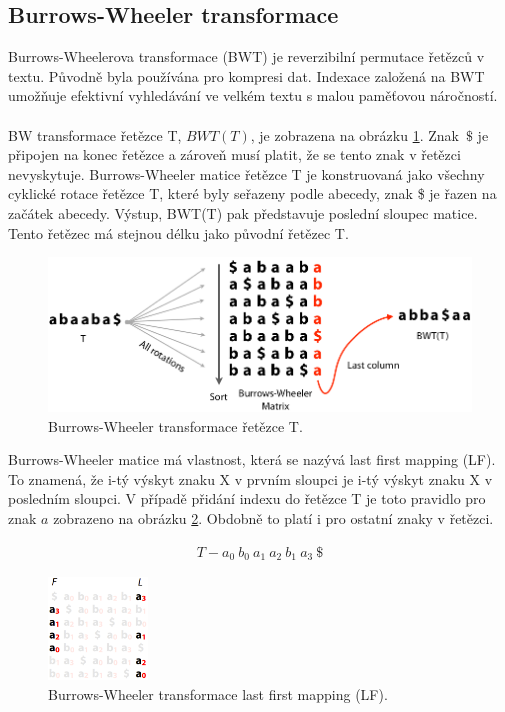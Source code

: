 \documentclass[czech,DP]{thesiskiv}
\numberwithin{equation}{section}
\begin{document}
\subsection{Burrows-Wheeler transformace}
Burrows-Wheelerova transformace (BWT) je reverzibilní permutace řetězců v textu. Původně byla používána pro kompresi dat. Indexace založená na BWT umožňuje efektivní vyhledávání ve velkém textu s malou paměťovou náročností. 
\\
\\
BW transformace řetězce T, $BWT(T)$, je zobrazena na obrázku \ref{fig:bw_transform_1}. Znak~$\$$ je připojen na konec řetězce a zároveň musí platit, že se tento znak v řetězci nevyskytuje. Burrows-Wheeler matice řetězce T je konstruovaná jako všechny cyklické rotace řetězce T, které byly seřazeny podle abecedy, znak \$ je řazen na začátek abecedy. Výstup, BWT(T) pak představuje poslední sloupec matice. Tento řetězec má stejnou délku jako původní řetězec T. \cite{bowtie} 

\begin{figure}[H]		
		\centering
		\includegraphics[width=.8\textwidth]{./img/BWT_1.png}
		\caption{Burrows-Wheeler transformace řetězce T. \cite{bw_transform}}
		\label{fig:bw_transform_1}
\end{figure}

\noindent
Burrows-Wheeler matice má vlastnost, která se nazývá last first mapping (LF). To znamená, že i-tý výskyt znaku X v prvním sloupci je i-tý výskyt znaku X v posledním sloupci. V případě přidání indexu do řetězce T je toto pravidlo pro znak $a$ zobrazeno na obrázku \ref{fig:bw_transform_lf}. Obdobně to platí i pro ostatní znaky v řetězci.

\begin{align}
   \label{rerezec_t} T - a_0 \: b_0 \: a_1 \: a_2 \: b_1 \: a_3 \: \$
\end{align}



\begin{figure}[H]		
		\centering
		\includegraphics[width=100px]{./img/BWT_2.png}
		\caption{Burrows-Wheeler transformace last first mapping (LF). \cite{bw_transform}}
		\label{fig:bw_transform_lf}
\end{figure}
\end{document}
